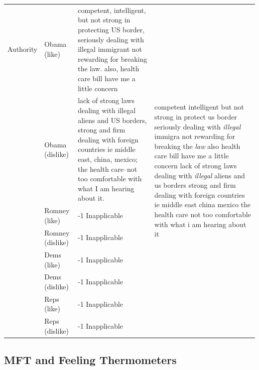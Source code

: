 \documentclass[12pt]{article}
\begin{document}
\begin{center}
\begin{longtable}{lp{1.5cm}p{5.5cm}p{5.5cm}}
	 Authority & Obama (like) & competent, intelligent, but not strong in protecting US border, seriously dealing with illegal immigrant not rewarding for breaking the law. also, health care bill have me a little concern & \multirow{8}{5.5cm}{competent intelligent but not strong in protect us border seriously dealing with \textit{illegal} immigra not rewarding for breaking the \textit{law} also health care bill have me a little concern lack of strong laws dealing with \textit{illegal} aliens and us borders strong and firm dealing with foreign countries ie middle east china mexico the health care not too comfortable with what i am hearing about it} \\
	 	 & Obama (dislike) & lack of strong laws dealing with illegal aliens and US borders, strong and firm dealing with foreign countries ie middle east, china, mexico; the health care--not too comfortable with what I am hearing about it. \\
	 	 & Romney (like) & -1 Inapplicable \\
	 	 & Romney (dislike) & -1 Inapplicable \\
	 	 & Dems (like) & -1 Inapplicable \\
	 	 & Dems (dislike) & -1 Inapplicable \\
	 	 & Reps (like) & -1 Inapplicable \\
	 	 & Reps (dislike) & -1 Inapplicable \\
\end{longtable}
\end{center}




\subsection{MFT and Feeling Thermometers}
\end{document}
